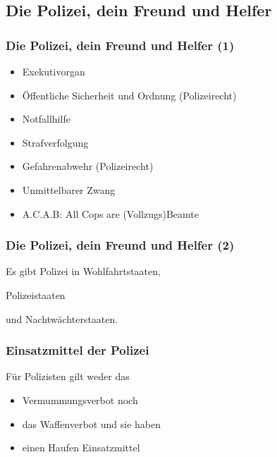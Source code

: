 \documentclass[]{beamer}
\begin{document}
	\begin{frame}
	\subsection{Die Polizei, dein Freund und Helfer}
	\frametitle{Die Polizei, dein Freund und Helfer (1)}
	\begin{itemize}
		\item Exekutivorgan
		\item Öffentliche Sicherheit und Ordnung (Polizeirecht)
		\item Notfallhilfe
		\item Strafverfolgung
		\item Gefahrenabwehr (Polizeirecht)
		\item Unmittelbarer Zwang
		\item A.C.A.B: All Cops are (Vollzugs)Beamte
	\end{itemize}
	\end{frame}

	\begin{frame}
	\frametitle{Die Polizei, dein Freund und Helfer (2)}
	Es gibt Polizei in Wohlfahrtstaaten,\par
	Polizeistaaten\par
	und Nachtwächterstaaten.
	\end{frame}

	\begin{frame}
	\frametitle{Einsatzmittel der Polizei}
	Für Polizisten gilt weder das 
	\begin{itemize}
		\item Vermummungsverbot noch
		\item das Waffenverbot und sie haben
		\item einen Haufen Einsatzmittel
	\end{itemize}
	\end{frame}
\end{document}
